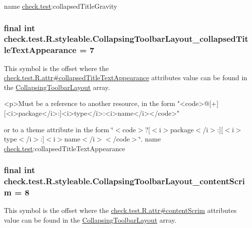 name \hyperlink{namespacecheck_1_1test}{check.\+test}\+:collapsed\+Title\+Gravity \hypertarget{classcheck_1_1test_1_1_r_1_1styleable_af8c6af1685175b4f7441abd8ac238f71}{}
\subsubsection[{Collapsing\+Toolbar\+Layout\+\_\+collapsed\+Title\+Text\+Appearance}]{\setlength{\rightskip}{0pt plus 5cm}final int check.\+test.\+R.\+styleable.\+Collapsing\+Toolbar\+Layout\+\_\+collapsed\+Title\+Text\+Appearance = 7\hspace{0.3cm}{\ttfamily [static]}}\label{classcheck_1_1test_1_1_r_1_1styleable_af8c6af1685175b4f7441abd8ac238f71}
This symbol is the offset where the \hyperlink{classcheck_1_1test_1_1_r_1_1attr_aad84eb784818494ebe3561b1faae4952}{check.\+test.\+R.\+attr\#collapsed\+Title\+Text\+Appearance} attribute\textquotesingle{}s value can be found in the \hyperlink{classcheck_1_1test_1_1_r_1_1styleable_a0c512120c75d0ddac20063034a72db17}{Collapsing\+Toolbar\+Layout} array.

\begin{DoxyVerb}      <p>Must be a reference to another resource, in the form "<code>@[+][<i>package</i>:]<i>type</i>:<i>name</i></code>"
\end{DoxyVerb}
 or to a theme attribute in the form \char`\"{}$<$code$>$?\mbox{[}$<$i$>$package$<$/i$>$\+:\mbox{]}\mbox{[}$<$i$>$type$<$/i$>$\+:\mbox{]}$<$i$>$name$<$/i$>$$<$/code$>$\char`\"{}.  name \hyperlink{namespacecheck_1_1test}{check.\+test}\+:collapsed\+Title\+Text\+Appearance \hypertarget{classcheck_1_1test_1_1_r_1_1styleable_aafa0dc99209d496d21b18f2db67597f1}{}
\subsubsection[{Collapsing\+Toolbar\+Layout\+\_\+content\+Scrim}]{\setlength{\rightskip}{0pt plus 5cm}final int check.\+test.\+R.\+styleable.\+Collapsing\+Toolbar\+Layout\+\_\+content\+Scrim = 8\hspace{0.3cm}{\ttfamily [static]}}\label{classcheck_1_1test_1_1_r_1_1styleable_aafa0dc99209d496d21b18f2db67597f1}
This symbol is the offset where the \hyperlink{classcheck_1_1test_1_1_r_1_1attr_ae9b64be1267d0d817f88a850226d571f}{check.\+test.\+R.\+attr\#content\+Scrim} attribute\textquotesingle{}s value can be found in the \hyperlink{classcheck_1_1test_1_1_r_1_1styleable_a0c512120c75d0ddac20063034a72db17}{Collapsing\+Toolbar\+Layout} array.

